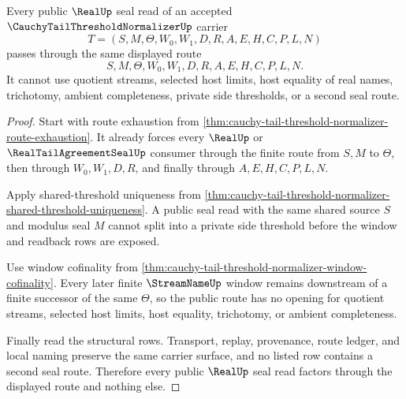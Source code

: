 \begin{theorem}
\label{thm:cauchy-tail-threshold-normalizer-real-seal-public-route}
Every public $\RealUp$ seal read of an accepted $\CauchyTailThresholdNormalizerUp$ carrier
$$
T=(S,M,\Theta,W_0,W_1,D,R,A,E,H,C,P,L,N)
$$
passes through the same displayed route
$$
S,M,\Theta,W_0,W_1,D,R,A,E,H,C,P,L,N .
$$
It cannot use quotient streams, selected host limits, host equality of real names, trichotomy, ambient completeness, private side thresholds, or a second seal route.
\end{theorem}
\begin{proof}
Start with route exhaustion from \autoref{thm:cauchy-tail-threshold-normalizer-route-exhaustion}. It already forces every $\RealUp$ or $\RealTailAgreementSealUp$ consumer through the finite route from $S,M$ to $\Theta$, then through $W_0,W_1,D,R$, and finally through $A,E,H,C,P,L,N$.

Apply shared-threshold uniqueness from \autoref{thm:cauchy-tail-threshold-normalizer-shared-threshold-uniqueness}. A public seal read with the same shared source $S$ and modulus seal $M$ cannot split into a private side threshold before the window and readback rows are exposed.

Use window cofinality from \autoref{thm:cauchy-tail-threshold-normalizer-window-cofinality}. Every later finite $\StreamNameUp$ window remains downstream of a finite successor of the same $\Theta$, so the public route has no opening for quotient streams, selected host limits, host equality, trichotomy, or ambient completeness.

Finally read the structural rows. Transport, replay, provenance, route ledger, and local naming preserve the same carrier surface, and no listed row contains a second seal route. Therefore every public $\RealUp$ seal read factors through the displayed route and nothing else.
\end{proof}

